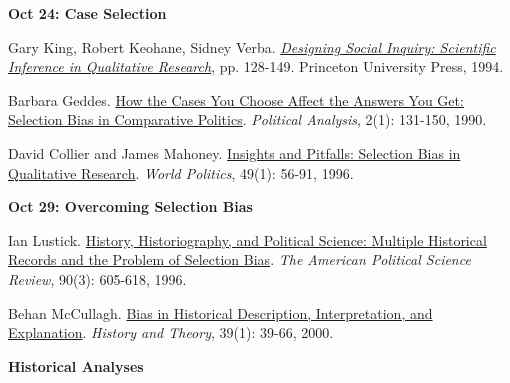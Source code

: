 \documentclass[letterpaper]{article}
\renewenvironment{itemize}{
  \begin{list}{}{
    \setlength{\leftmargin}{1.5em}
  }
}{
  \end{list}
}
\begin{document}
\begin{enumerate}
		\begin{itemize}
		\item {\bf Oct 24: Case Selection}
			\begin{itemize}
			\item[$\bullet$] Gary King, Robert Keohane, Sidney Verba. \href{https://sites.duke.edu/niou/files/2014/06/king94book.pdf}{\emph{Designing Social Inquiry: Scientific Inference in Qualitative Research}}, pp. 128-149. Princeton University Press, 1994.
			\item[$\bullet$] Barbara Geddes. \href{https://doi.org/10.1093/pan/2.1.131}{How the Cases You Choose Affect the Answers You Get: Selection Bias in Comparative Politics}. \emph{Political Analysis}, 2(1): 131-150, 1990.
			\item[$\bullet$] David Collier and James Mahoney. \href{http://www.jstor.org/stable/25053989}{Insights and Pitfalls: Selection Bias in Qualitative Research}. \emph{World Politics}, 49(1): 56-91, 1996. 

			\end{itemize}
		\end{itemize}

		\begin{itemize}
		\item {\bf Oct 29: Overcoming Selection Bias}
			\begin{itemize}
				\item[$\bullet$] Ian Lustick. \href{http://www.jstor.org/stable/2082612}{History, Historiography, and Political Science: Multiple Historical Records and the Problem of Selection Bias}. \emph{The American Political Science Review}, 90(3): 605-618, 1996.
				\item[$\bullet$] Behan McCullagh. \href{http://www.jstor.org/stable/2677997}{Bias in Historical Description, Interpretation, and Explanation}. \emph{History and Theory}, 39(1): 39-66, 2000.
			\end{itemize}
		\end{itemize}


\item {\bf Historical Analyses}
		

\end{enumerate}
\end{document}
